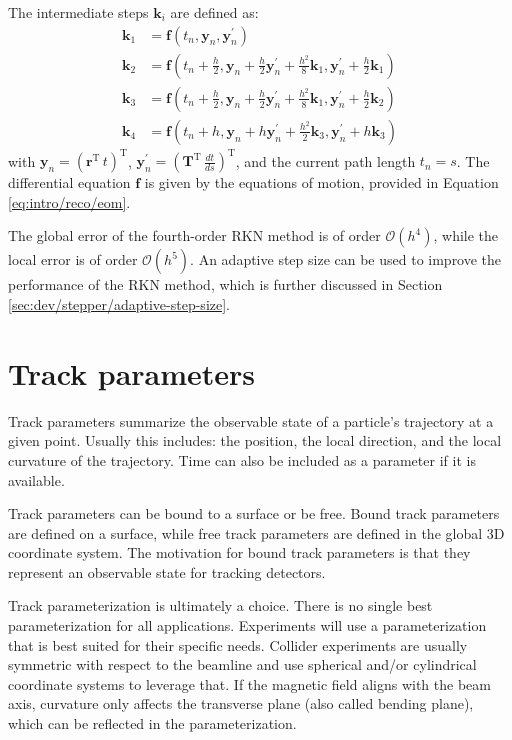 The intermediate steps $\mathbf{k}_i$ are defined as:
\begin{align}
    \mathbf{k}_1 &= \mathbf{f}\left( t_n, \mathbf{y}_n, \mathbf{y}^{\prime}_n \right) \\
    \mathbf{k}_2 &= \mathbf{f}\left( t_n + \frac{h}{2}, \mathbf{y}_n + \frac{h}{2} \mathbf{y}^{\prime}_n + \frac{h^2}{8} \mathbf{k}_1, \mathbf{y}^{\prime}_n + \frac{h}{2} \mathbf{k}_1 \right) \\
    \mathbf{k}_3 &= \mathbf{f}\left( t_n + \frac{h}{2}, \mathbf{y}_n + \frac{h}{2} \mathbf{y}^{\prime}_n + \frac{h^2}{8} \mathbf{k}_1, \mathbf{y}^{\prime}_n + \frac{h}{2} \mathbf{k}_2 \right) \\
    \mathbf{k}_4 &= \mathbf{f}\left( t_n + h, \mathbf{y}_n + h \mathbf{y}^{\prime}_n + \frac{h^2}{2} \mathbf{k}_3, \mathbf{y}^{\prime}_n + h \mathbf{k}_3 \right)
    \label{eq:intro/reco/rkn-steps}
\end{align}
with $\mathbf{y}_n = \left( \mathbf{r}^\mathrm{T} \, t \right)^\mathrm{T}$, $\mathbf{y}^{\prime}_n = \left( \mathbf{T}^\mathrm{T} \, \frac{dt}{ds} \right)^\mathrm{T}$, and the current path length $t_n = s$. The differential equation $\mathbf{f}$ is given by the equations of motion, provided in Equation \ref{eq:intro/reco/eom}.

The global error of the fourth-order RKN method is of order $\mathcal{O}(h^4)$, while the local error is of order $\mathcal{O}(h^5)$. An adaptive step size can be used to improve the performance of the RKN method, which is further discussed in Section \ref{sec:dev/stepper/adaptive-step-size}.

\section{Track parameters}

Track parameters summarize the observable state of a particle's trajectory at a given point. Usually this includes: the position, the local direction, and the local curvature of the trajectory. Time can also be included as a parameter if it is available.

Track parameters can be bound to a surface or be free. Bound track parameters are defined on a surface, while free track parameters are defined in the global 3D coordinate system. The motivation for bound track parameters is that they represent an observable state for tracking detectors.

Track parameterization is ultimately a choice. There is no single best parameterization for all applications. Experiments will use a parameterization that is best suited for their specific needs. Collider experiments are usually symmetric with respect to the beamline and use spherical and/or cylindrical coordinate systems to leverage that. If the magnetic field aligns with the beam axis, curvature only affects the transverse plane (also called bending plane), which can be reflected in the parameterization.

